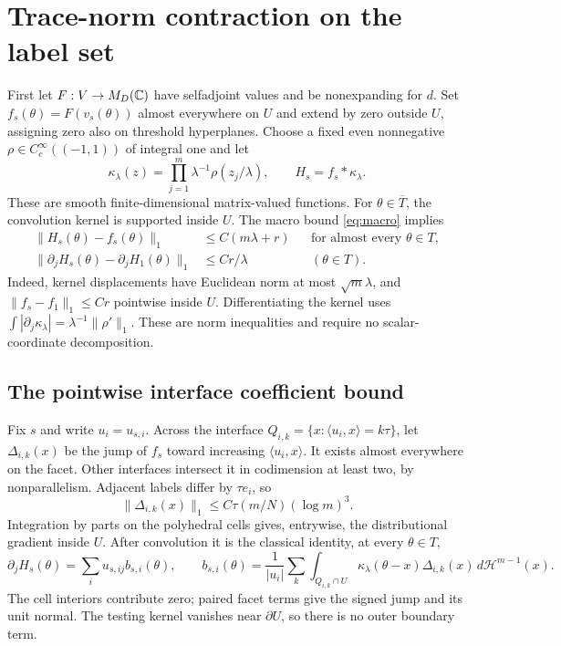 \documentclass[11pt]{article}
\theoremstyle{remark}\newtheorem{remark}[theorem]{Remark}
\numberwithin{equation}{section}
\newcommand{\ip}[2]{\langle #1,#2\rangle}
\newcommand{\norm}[1]{\lVert #1\rVert}
\begin{document}
\section{Trace-norm contraction on the label set}\label{sec:contraction}
First let $F:V\to M_D(\mathbb C)$ have selfadjoint values and be nonexpanding
for $d$. Set $f_s(\theta)=F(v_s(\theta))$ almost everywhere on $U$ and
extend by zero outside $U$, assigning zero also on threshold hyperplanes.
Choose a fixed even nonnegative $\rho\in C_c^\infty((-1,1))$ of integral
one and let
\[
 \kappa_\lambda(z)=\prod_{j=1}^m\lambda^{-1}\rho(z_j/\lambda),
 \qquad H_s=f_s*\kappa_\lambda.
\]
These are smooth finite-dimensional matrix-valued functions. For
$\theta\in\overline T$, the convolution kernel is supported inside $U$.
The macro bound \eqref{eq:macro} implies
\begin{align}
 \norm{H_s(\theta)-f_s(\theta)}_1&\le C(m\lambda+r)
                  &&\text{for almost every }\theta\in T,\label{eq:smoothing}\\
 \norm{\partial_jH_s(\theta)-\partial_jH_1(\theta)}_1&\le Cr/\lambda
                  &&(\theta\in T).\label{eq:mismatch}
\end{align}
Indeed, kernel displacements have Euclidean norm at most $\sqrt m\lambda$,
and $\norm{f_s-f_1}_1\le Cr$ pointwise inside $U$. Differentiating the
kernel uses $\int|\partial_j\kappa_\lambda|=\lambda^{-1}\norm{\rho'}_1$.
These are norm inequalities and require no scalar-coordinate decomposition.

\subsection{The pointwise interface coefficient bound}
Fix $s$ and write $u_i=u_{s,i}$. Across the interface
$Q_{i,k}=\{x:\ip{u_i}x=k\tau\}$, let $\Delta_{i,k}(x)$ be the jump
of $f_s$ toward increasing $\ip{u_i}x$. It exists almost everywhere on
the facet. Other interfaces intersect it in codimension at least two,
by nonparallelism. Adjacent labels differ by $\tau e_i$, so
\[
 \norm{\Delta_{i,k}(x)}_1\le C\tau(m/N)(\log m)^3.
\]
Integration by parts on the polyhedral cells gives, entrywise, the
distributional gradient inside $U$. After convolution it is the classical
identity, at every $\theta\in T$,
\begin{equation}\label{eq:coefficients}
 \partial_j H_s(\theta)=\sum_i u_{s,ij}b_{s,i}(\theta),\qquad
 b_{s,i}(\theta)=\frac1{|u_i|}\sum_k\int_{Q_{i,k}\cap U}
 \kappa_\lambda(\theta-x)\Delta_{i,k}(x)\,d\mathcal H^{m-1}(x).
\end{equation}
The cell interiors contribute zero; paired facet terms give the signed
jump and its unit normal. The testing kernel vanishes near $\partial U$,
so there is no outer boundary term.
\end{document}
